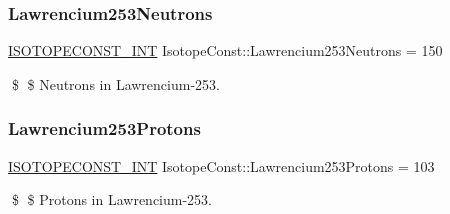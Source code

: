 \subsubsection{\texorpdfstring{Lawrencium253\+Neutrons}{Lawrencium253Neutrons}}
{\footnotesize\ttfamily \mbox{\hyperlink{group___isotope_const-_macros_ga5f18360b3e99483a35c32d789e62621c}{I\+S\+O\+T\+O\+P\+E\+C\+O\+N\+S\+T\+\_\+\+I\+NT}} Isotope\+Const\+::\+Lawrencium253\+Neutrons = 150}

\$ \$ Neutrons in Lawrencium-\/253. \mbox{\label{group___isotope_const-_lawrencium-_lr253_ga38feb17a228e35901b6d4e6baf7b0ab3}} 
\subsubsection{\texorpdfstring{Lawrencium253\+Protons}{Lawrencium253Protons}}
{\footnotesize\ttfamily \mbox{\hyperlink{group___isotope_const-_macros_ga5f18360b3e99483a35c32d789e62621c}{I\+S\+O\+T\+O\+P\+E\+C\+O\+N\+S\+T\+\_\+\+I\+NT}} Isotope\+Const\+::\+Lawrencium253\+Protons = 103}

\$ \$ Protons in Lawrencium-\/253. 